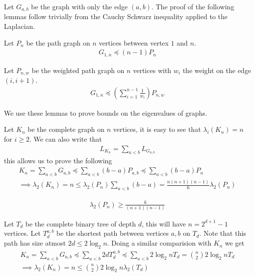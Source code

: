 \documentclass{math}
\begin{document}
Let $G_{a, b}$ be the graph with only the edge $(a, b)$.
The proof of the following lemmas follow trivially from the Cauchy Schwarz inequality applied to the Laplacian.

\begin{lemma}
    Let $P_n$ be the path graph on $n$ vertices between vertex $1$ and $n$.
    \begin{align*}
        G_{1, n} \preceq (n - 1)P_n
    \end{align*}
\end{lemma}

\begin{lemma}
    Let $P_{n, w}$ be the weighted path graph on $n$ vertices with $w_i$ the weight on the edge $(i, i+1)$.
    \begin{align*}
        G_{1, n} \preceq \left(\sum_{i=1}^{n-1} \frac{1}{w_i}\right) P_{n, w}
    \end{align*}
\end{lemma}

We use these lemmas to prove bounds on the eigenvalues of graphs.

Let $K_n$ be the complete graph on $n$ vertices, it is easy to see that $\lambda_i(K_n) = n$ for $i \geq 2$.
We can also write that
\begin{align*}
    L_{K_n} = \sum_{a < b} L_{G_{a, b}}
\end{align*}
this allows us to prove the following
\begin{gather*}
    K_n = \sum_{a < b} G_{a, b} \preceq \sum_{a < b} (b - a) P_{a, b} \preceq \sum_{a < b} (b - a) P_n \\
    \implies \lambda_2(K_n) = n \leq \lambda_2(P_n) \sum_{a < b} (b - a) = \frac{n (n + 1) (n - 1)}{6} \lambda_2(P_n)
\end{gather*}

\begin{lemma}
    \begin{align*}
        \lambda_2(P_n) \geq \frac{6}{(n+1)(n-1)}
    \end{align*}
\end{lemma}

Let $T_d$ be the complete binary tree of depth $d$, this will have $n = 2^{d+1} - 1$ vertices.
Let $T_d^{a, b}$ be the shortest path between vertices $a, b$ on $T_d$.
Note that this path has size atmost $2d \leq 2 \log_{2} n$. Doing a similar comparision with $K_n$ we get
\begin{gather*}
    K_n = \sum_{a < b} G_{a, b} \preceq \sum_{a < b} 2d T_d^{a, b} \preceq \sum_{a < b} 2 \log_2 n T_d = \binom{n}{2} 2 \log_2 n T_d \\
    \implies \lambda_2(K_n) = n \leq \binom{n}{2} 2 \log_2 n \lambda_2(T_d)
\end{gather*}
\end{document}

